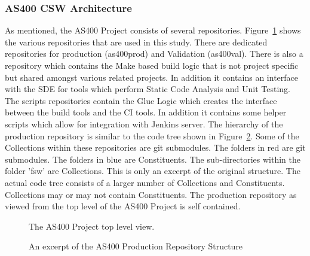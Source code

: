 \documentclass[12pt, a4paper, titlepage]{scrartcl}
\begin{document}
\subsubsection{AS400 CSW Architecture }
As mentioned, the AS400 Project consists of several repositories. Figure~\ref{fig:as400-top-level} shows the various repositories that are used in this study. There are dedicated repositories for production (as400prod) and Validation (as400val). There is also a repository which contains the Make based build logic that is not project specific but shared amongst various related projects. In addition it contains an interface with the SDE for tools which perform Static Code Analysis and Unit Testing. The scripts repositories contain the Glue Logic which creates the interface between the build tools and the CI tools. In addition it contains some helper scripts which allow for integration with Jenkins server. The hierarchy of the production repository is similar to the code tree shown in Figure~\ref{fig:prod-repo-structure}. Some of the Collections within these repositories are git submodules\cite{chacon2011git}. The folders in red are git submodules. The folders in blue are Constituents. The sub-directories within the folder 'fsw' are Collections. This is only an excerpt of the original structure. The actual code tree consists of a larger number of Collections and Constituents. Collections may or may not contain Constituents. The production repository as viewed from the top level of the AS400 Project is self contained.  

\begin{figure}[h]
\caption{The AS400 Project top level view.}
\label{fig:as400-top-level}
\noindent{}
\end{figure}
\begin{figure}
\caption{An excerpt of the AS400 Production Repository Structure}
\label{fig:prod-repo-structure}
\noindent{}
\end{figure}
\end{document}

